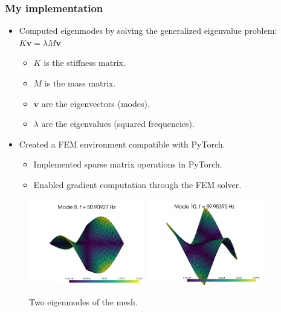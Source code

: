 \documentclass{beamer}
\begin{document}
\begin{frame}
\frametitle{My implementation}
\begin{itemize}
    \item Computed eigenmodes by solving the generalized eigenvalue problem: \( K \mathbf{v} = \lambda M \mathbf{v} \)
    \begin{itemize}
        \item \( K \) is the stiffness matrix.
        \item \( M \) is the mass matrix.
        \item \( \mathbf{v} \) are the eigenvectors (modes).
        \item \( \lambda \) are the eigenvalues (squared frequencies).
    \end{itemize}
    \item Created a FEM environment compatible with PyTorch.
    \begin{itemize}
        \item Implemented sparse matrix operations in PyTorch.
        \item Enabled gradient computation through the FEM solver.
    \end{itemize}
\end{itemize}

\begin{figure}
    \centering
    \includegraphics[width=0.45\textwidth]{Images/mode_9.png}
    \includegraphics[width=0.45\textwidth]{Images/mode_10.png}
    \caption{Two eigenmodes of the mesh.}
    \label{fig:eigenmodes}
\end{figure}
\end{frame}
\end{document}
